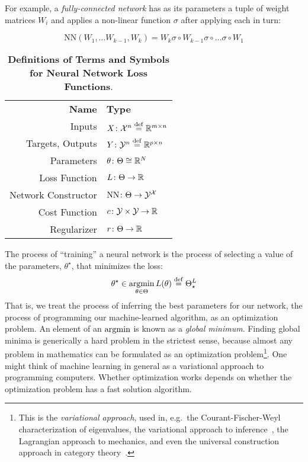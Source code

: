\documentclass[../../thesis.tex]{subfiles}
\begin{document}
For example,
a \emph{fully-connected network}
has as its parameters a tuple of weight matrices $W_i$
and applies a non-linear function $\sigma$
after applying each in turn:

\begin{equation}
	\mathrm{NN}\left(W_1, \dots W_{k-1}, W_k\right) = W_k \sigma \circ W_{k-1} \sigma \circ \dots \sigma \circ W_1
\end{equation}

\begin{table}[h]
	\begin{center}
		\begin{tabular}{rl}
			\textbf{Name}       & \textbf{Type}                          \\
			Inputs              & $X \colon {\mathcal{X}}^n \stackrel{\small \mathrm{def}}{=} \mathbb{R}^{m\times n}$  \\
			Targets, Outputs    & $Y \colon {\mathcal{Y}}^n \stackrel{\small \mathrm{def}}{=} \mathbb{R}^{p\times n}$  \\
			Parameters          & $\theta \colon \Theta \cong \mathbb{R}^N$        \\
			Loss Function       & $L \colon \Theta \to \mathbb{R}$                \\
			Network Constructor & $\mathrm{NN} \colon \Theta \to {\mathcal{Y}}^{\mathcal{X}}$ \\
			Cost Function       & $c \colon {\mathcal{Y}} \times {\mathcal{Y}} \to \mathbb{R}$        \\
			Regularizer         & $r \colon \Theta \to \mathbb{R}$
		\end{tabular}
	\end{center}
	\caption{\textbf{Definitions of Terms and Symbols for Neural Network Loss Functions}.}
\end{table}

The process of \enquote{training} a neural network is the process
of selecting a value of the parameters, $\theta^\star$, that minimizes the loss:
\begin{equation}\equationlabel{minimize}
	\theta^\star \in \argmin_{\theta \in \Theta} L(\theta) \defeq \Theta^L_{\star}
\end{equation}
That is, we treat the process of inferring the best parameters for our network,
the process of programming our machine-learned algorithm,
as an optimization problem.
An element of an $\mathop{\mathrm{argmin}}$ is known as a \emph{global minimum}.
Finding global minima is generically a hard problem in the strictest sense,
because almost any problem in mathematics can be formulated as an
optimization problem\footnote{This is the \emph{variational approach},
used in, e.g.~the Courant-Fischer-Weyl characterization of eigenvalues,
the variational approach to inference~\cite{wainwright2007},
the Lagrangian approach to mechanics,
and even the universal construction approach in category theory~\cite{milewski2014}.
}.
One might think of machine learning in general as
a variational approach to programming computers.
Whether optimization works
depends on whether the optimization problem
has a fast solution algorithm.
\end{document}
